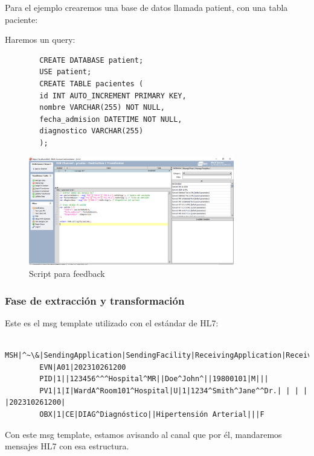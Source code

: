 \documentclass[12pt, a4paper, twoside]{article}
\begin{document}
	Para el ejemplo crearemos una base de datos llamada patient, con una tabla paciente: 
	
	Haremos un query:
	
	\begin{verbatim}
		CREATE DATABASE patient; 
		USE patient;
		CREATE TABLE pacientes (
		id INT AUTO_INCREMENT PRIMARY KEY,
		nombre VARCHAR(255) NOT NULL,
		fecha_admision DATETIME NOT NULL,
		diagnostico VARCHAR(255)
		);
	\end{verbatim}
	
	\begin{figure}[h!]
		\centering
		\includegraphics[width=0.8\textwidth]{image/7.png}
		\caption{Script para feedback}
		\label{fig:7}
	\end{figure}
	
	\subsubsection{Fase de extracción y transformación}
	
	Este es el msg template utilizado con el estándar de HL7:
	
	\begin{verbatim}
		MSH|^~\&|SendingApplication|SendingFacility|ReceivingApplication|ReceivingFacility|202310261200||ADT^A01|123456|P|2.5
		EVN|A01|202310261200
		PID|1||123456^^^Hospital^MR||Doe^John^||19800101|M|||
		PV1|1|I|WardA^Room101^Hospital|U|1|1234^Smith^Jane^^Dr.| | | | |202310261200|
		OBX|1|CE|DIAG^Diagnóstico||Hipertensión Arterial|||F
	\end{verbatim}

	Con este msg template, estamos avisando al canal que por él, mandaremos mensajes HL7 con esa estructura. 
	
\end{document}
